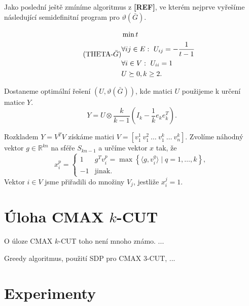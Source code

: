 Jako poslední ještě zmíníme algoritmus z \textbf{[REF]}, ve kterém nejprve vyřešíme následující semidefinitní program pro $\vartheta(\bar{G})$.

\begin{equation}\tag{THETA-$\bar{G}$}
    \begin{split}
        &\min t \\
        &\forall ij \in E:\ U_{ij} = -\frac{1}{t - 1} \\
        &\forall i \in V:\ U_{ii} = 1 \\
        &U \succeq 0, k \geq 2.
    \end{split}
    \label{eq:THETA-BAR-G}
\end{equation}

\noindent Dostaneme optimální řešení $(U, \vartheta(\bar{G}))$, kde matici $U$ použijeme k určení matice $Y$.
$$
    Y = U \otimes \frac{k}{k - 1} \left( I_k - \frac{1}{k} e_k e_k^T \right).
$$

\noindent Rozkladem $Y = V^TV$ získáme matici $V = \left[ v_1^1\ v_1^2\ \dots\ v_1^k\ \dots\ v_n^k \right]$.
Zvolíme náhodný vektor $g \in \mathbb{R}^{kn}$ na sféře $S_{kn-1}$ a určíme vektor $x$ tak, že
$$
    x_i^p = 
    \begin{cases}
        1  & g^T v_i^p = \max \left\{ \langle g, v_i^q \rangle \mid q = 1, \dots, k \right\}, \\
        -1 & \text{jinak.}
    \end{cases}
$$
Vektor $i \in V$ jsme přiřadili do množiny $V_j$, jestliže $x_i^j = 1$.


\section{Úloha CMAX $k$-CUT}

O úloze CMAX $k$-CUT toho není mnoho známo. ...

Greedy algoritmus, použití SDP pro CMAX $3$-CUT, ...

\section{Experimenty}




